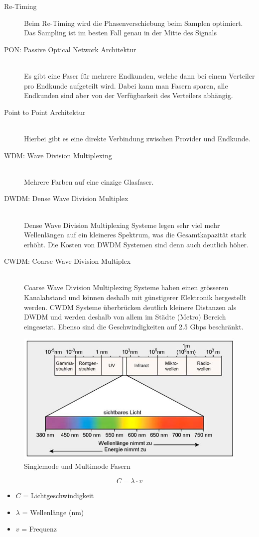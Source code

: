\begin{description}
	\item[Re-Timing] Beim Re-Timing wird die Phasenverschiebung beim Samplen optimiert. Das Sampling ist im besten Fall genau in der Mitte des Signals
	\item[PON: Passive Optical Network Architektur] \hfill \\
	Es gibt eine Faser für mehrere Endkunden, welche dann bei einem Verteiler pro Endkunde aufgeteilt wird. Dabei kann man Fasern sparen, alle Endkunden sind aber von der Verfügbarkeit des Verteilers abhängig.
	\item[Point to Point Architektur] \hfill \\
	Hierbei gibt es eine direkte Verbindung zwischen Provider und Endkunde. 
	\item[WDM: Wave Division Multiplexing] \hfill \\
	Mehrere Farben auf eine einzige Glasfaser.
	\item[DWDM: Dense Wave Division Multiplex] \hfill \\
	Dense Wave Division	Multiplexing Systeme legen sehr viel mehr Wellenlängen auf ein kleineres Spektrum, was die Gesamtkapazität	stark erhöht. Die	Kosten von DWDM	Systemen	sind denn auch deutlich	höher.	
	\item[CWDM: Coarse Wave Division Multiplex] \hfill \\
	Coarse Wave Division Multiplexing Systeme haben einen grösseren Kanalabstand und können deshalb mit günstigerer Elektronik hergestellt werden. CWDM Systeme überbrücken deutlich kleinere Distanzen als DWDM und 
	werden deshalb von allem im Städte (Metro) Bereich eingesetzt. Ebenso sind die Geschwindigkeiten auf 2.5 Gbps 
	beschränkt.
\end{description}

\begin{figure}[h]
	\centering
	\includegraphics[width=0.4\linewidth]{images/wellenlaengen.jpg}
	\caption{Singlemode und Multimode Fasern}
\end{figure}

\[ C = \lambda \cdot v \]
\begin{itemize}[label=]
	\item $C$ = Lichtgeschwindigkeit
	\item $\lambda$ = Wellenlänge (nm)
	\item $v$ = Frequenz 
\end{itemize}

